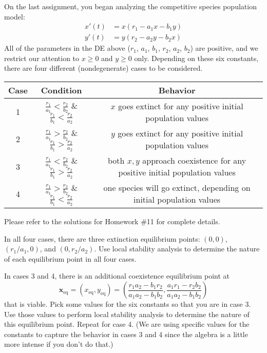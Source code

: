 \documentclass[boxes]{gsypset}
\begin{document}
	\begin{problem}
		On the last assignment, you began analyzing the competitive species population model:
		\begin{align*}
			x'(t) &= x(r_1-a_1x-b_1y) \\
			y'(t) &= y(r_2-a_2y-b_2x)
		\end{align*}
		All of the parameters in the DE above ($r_1$, $a_1$, $b_1$, $r_2$, $a_2$, $b_2$) are positive, 
		and we restrict our attention to $x\geq 0$ and $y\geq 0$ only.  
		Depending on these six constants, there are four different 
		(nondegenerate) cases to be considered.
		
		\footnotesize
		\begin{tabular}{c|c|c}
			Case & Condition & Behavior \\ \hline
			1 & 
			$\frac{r_1}{a_1}<\frac{r_2}{b_2}$ \&
			$\frac{r_1}{b_1}<\frac{r_2}{a_2}$
			&
			$x$ goes extinct for any positive initial population values \\
			2 & 
			$\frac{r_1}{a_1}>\frac{r_2}{b_2}$ \&
			$\frac{r_1}{b_1}>\frac{r_2}{a_2}$
			&
			$y$ goes extinct for any positive initial population values \\
			3 & 
			$\frac{r_1}{a_1}<\frac{r_2}{b_2}$ \&
			$\frac{r_1}{b_1}>\frac{r_2}{a_2}$
			&
			both $x,y$ approach coexistence for any positive initial population values \\
			4 & 
			$\frac{r_1}{a_1}>\frac{r_2}{b_2}$ \&
			$\frac{r_1}{b_1}<\frac{r_2}{a_2}$
			&
			one species will go extinct, depending on initial population values
		\end{tabular}
		\normalsize
		
		Please refer to the solutions for Homework \#11 for complete details.
		\begin{subproblems}
			\subproblem 
				In all four cases, there are three extinction equilibrium points: 
				$(0,0)$, $(r_1/a_1,0)$, and $(0,r_2/a_2)$. 
				Use local stability analysis to determine the nature of 
				each equilibrium point in all four cases.
				\begin{solution}
					
				\end{solution}
			\subproblem 
				In cases 3 and 4, there is an additional coexistence equilibrium point at
				\[
					\mathbf{x}_{\text{eq}}
						= \left(x_{\text{eq}},y_{\text{eq}}\right)
						= \left(\frac{r_1a_2-b_1r_2}{a_1a_2-b_1b_2},\frac{a_1r_1-r_2b_2}{a_1a_2-b_1b_2}\right)
				\]
				that is viable. 
				Pick some values for the six constants so that you are in case 3. 
				Use those values to perform local stability analysis to 
				determine the nature of this equilibrium point. 
				Repeat for case 4.
				(We are using specific values for the constants to capture the behavior 
				in cases 3 and 4 since the algebra is a little more intense if you don't do that.)
				\begin{solution}
					

\end{solution}
\end{subproblems}
\end{problem}
\end{document}
